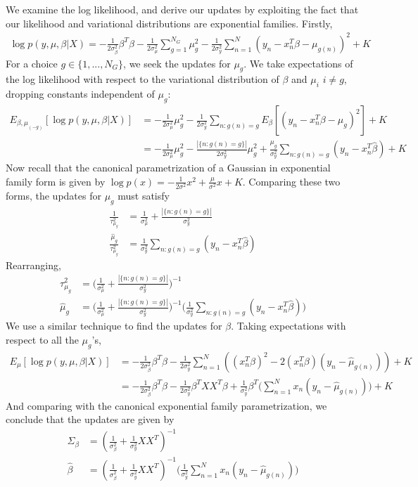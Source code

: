 \documentclass{article}
\begin{document}
We examine the log likelihood, and derive our updates by exploiting the fact that our likelihood and variational distributions are exponential families. Firstly, 
\begin{align}
\log p(y, \mu, \beta | X) = -\frac{1}{2\sigma^2_\beta}\beta^T\beta - \frac{1}{2\sigma^2_\mu}\sum_{g=1}^{N_G} \mu_g^2 - \frac{1}{2\sigma^2_y}\sum_{n=1}^N (y_n - x_n^T\beta - \mu_{g(n)})^2 + K
\end{align}
For a choice $g\in\{1, ..., N_G\}$, we seek the updates for $\mu_g$. We take expectations of the log likelihood with respect to the variational distribution of $\beta$ and $\mu_i$ $i\not=g$, dropping constants independent of $\mu_g$: 
\begin{align}
E_{\beta, \mu_{(-g)}} [ \log p(y, \mu, \beta | X) ] &=  - \frac{1}{2\sigma^2_\mu} \mu_g^2 - \frac{1}{2\sigma^2_y}\sum_{n: g(n) = g} E_{\beta}[(y_n - x_n^T\beta - \mu_{g})^2] + K\\
	&= - \frac{1}{2\sigma^2_\mu} \mu_g^2 - \frac{|\{n : g(n) = g\}|}{2\sigma^2_y} \mu_g^2 + \frac{\mu_g}{\sigma^2_y}\sum_{n: g(n) = g} (y_n - x_n^T\hat\beta) + K
\end{align}
Now recall that the canonical parametrization of a Gaussian in exponential family form is given by $\log p(x) = -\frac{1}{2\sigma^2} x^2 + \frac{\mu}{\sigma^2}x + K$. Comparing these two forms, the updates for $\mu_g$ must satisfy
\begin{align}
\frac{1}{\tau^2_{\mu_g}} &= \frac{1}{\sigma^2_\mu} + \frac{|\{n : g(n) = g\}|}{\sigma^2_y}\\
\frac{\hat\mu_g}{\tau^2_{\mu_g}} &= \frac{1}{\sigma^2_y}\sum_{n: g(n) = g} (y_n - x_n^T\hat\beta)
\end{align}
Rearranging, 
\begin{align}
{\tau^2_{\mu_g}} &= \Big(\frac{1}{\sigma^2_\mu} + \frac{|\{n : g(n) = g\}|}{\sigma^2_y}\Big)^{-1}\\
{\hat\mu_g} &= \Big(\frac{1}{\sigma^2_\mu} + \frac{|\{n : g(n) = g\}|}{\sigma^2_y}\Big)^{-1}\Big(\frac{1}{\sigma^2_y}\sum_{n: g(n) = g} (y_n - x_n^T\hat\beta)\Big)
\end{align}
We use a similar technique to find the updates for $\beta$. Taking expectations with respect to all the $\mu_g$'s, 
\begin{align}
E_\mu[\log p(y, \mu, \beta | X) ] &=  -\frac{1}{2\sigma^2_\beta}\beta^T\beta  - \frac{1}{2\sigma^2_y}\sum_{n=1}^N ((x_n^T\beta)^2 - 2(x_n^T\beta)(y_n - \hat\mu_{g(n)} )) + K\\
	&=  -\frac{1}{2\sigma^2_\beta}\beta^T\beta  - \frac{1}{2\sigma^2_y} \beta^TXX^T\beta + \frac{1}{\sigma^2_y}\beta^T\Big(\sum_{n=1}^N  x_n(y_n - \hat\mu_{g(n)} )\Big) + K
\end{align}
And comparing with the canonical exponential family parametrization, we conclude that the updates are given by
\begin{align}
\Sigma_\beta &= (\frac{1}{\sigma^2_\beta} + \frac{1}{\sigma^2_y}XX^T)^{-1}\\
\hat\beta &= (\frac{1}{\sigma^2_\beta} + \frac{1}{\sigma^2_y}XX^T)^{-1}\Big(\frac{1}{\sigma^2_y}\sum_{n=1}^N  x_n(y_n - \hat\mu_{g(n)} )\Big)
\end{align}
\end{document}
